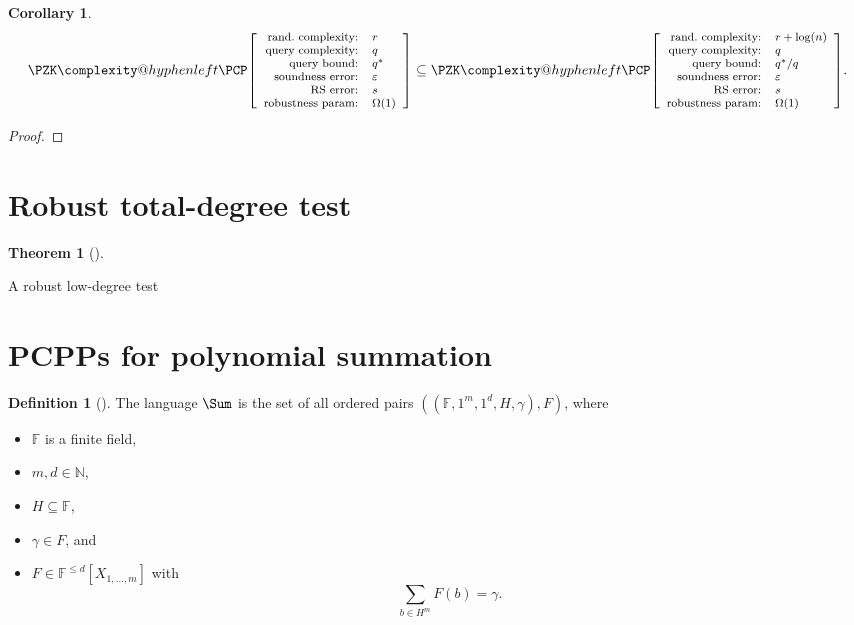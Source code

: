 \documentclass[english,12pt]{reedthesis}
\makeatletter
\theoremstyle{plain}
\newtheorem{thm}{Theorem}[section]
\newtheorem{cor}[cor]{Corollary}
\theoremstyle{definition}
\newtheorem{defn}[defn]{Definition}
\theoremstyle{remark}
\newcommand{\pzkpcpr}[6]{%
  \ensuremath%
  \mleft[{\footnotesize\begin{array}{r l}
    \text{rand.\ complexity:} & #1 \\
    \text{query complexity:} & #2 \\
    \text{query bound:} & #3 \\
    \text{soundness error:} & #4 \\
    \text{RS error:} & #5 \\
    \text{robustness param:} & #6
  \end{array}}\mright]%
}
\newcommand{\PZKPCP}{%
  \PZK\complexity@hyphenleft\PCP
}
\makeatother
\begin{document}
\begin{cor}\label{cor:constant-query}
  \begin{equation}\label{eqn:constant-query}
    \PZKPCP\pzkpcpr{r}{q}{q^{*}}{\varepsilon}{s}{\Omega(1)} \subseteq
    \PZKPCP\pzkpcpr{r + \log(n)}{q}{q^{*}/q}{\varepsilon}{s}{\Omega(1)}.
  \end{equation}
\end{cor}

\begin{proof}
\end{proof}

\section{Robust total-degree test}\label{sec:robust-degree}

\begin{thm}[{\cite[Prop.\ 5.7]{Par21}}]\label{thm:robust-low-deg}
\end{thm}

\begin{algorithm}[htbp]
  \caption{A robust low-degree test~\cite[Prop.\ 5.7]{Par21}}\label{alg:robust-low-deg}
\end{algorithm}

\section{PCPPs for polynomial summation}\label{sec:pcpp-poly-sum}

\begin{defn}[{\cite[Def.\ 4.1]{GOS25}}]\label{def:sum-lang}
  The language $\Sum$ is the set of all ordered pairs
  $((\mathbb{F}, 1^{m}, 1^{d}, H, \gamma), F)$, where
  \begin{itemize}
    \item $\mathbb{F}$ is a finite field,
    \item $m, d \in \mathbb{N}$,
    \item $H \subseteq \mathbb{F}$,
    \item $\gamma \in F$, and
    \item $F \in \mathbb{F}^{\le d}[X_{1, \ldots, m}]$ with
          \[
            \sum_{b \in H^{m}}F(b) = \gamma.
          \]
  \end{itemize}
\end{defn}
\end{document}

